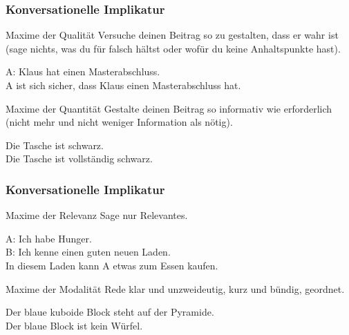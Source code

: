 
\begin{frame}
\frametitle{Konversationelle Implikatur}

\begin{block}{Maxime der Qualität}
	Versuche deinen Beitrag so zu gestalten, dass er wahr ist (sage nichts, was du für falsch hältst oder wofür du keine Anhaltspunkte hast).
	
	\ea A: Klaus hat einen Masterabschluss.\\
			\implc A ist sich sicher, dass Klaus einen Masterabschluss hat.
	\z
\end{block}

\begin{block}{Maxime der Quantität}
	Gestalte deinen Beitrag so informativ wie erforderlich (nicht mehr und nicht weniger Information als nötig).
	
	\ea Die Tasche ist schwarz.\\
			\implc Die Tasche ist vollständig schwarz.
	\z
\end{block}

\end{frame}

\begin{frame}
\frametitle{Konversationelle Implikatur}

\begin{block}{Maxime der Relevanz}
	Sage nur Relevantes.
	
	\ea A: Ich habe Hunger.\\
		   B: Ich kenne einen guten neuen Laden.\\
		   \implc In diesem Laden kann A etwas zum Essen kaufen.
	\z
\end{block}

\begin{block}{Maxime der Modalität}
	Rede klar und unzweideutig, kurz und bündig, geordnet.
	
	\ea Der blaue kuboide Block steht auf der Pyramide.\\
		   \implc Der blaue Block ist kein Würfel.
	\z
\end{block}

\end{frame}



